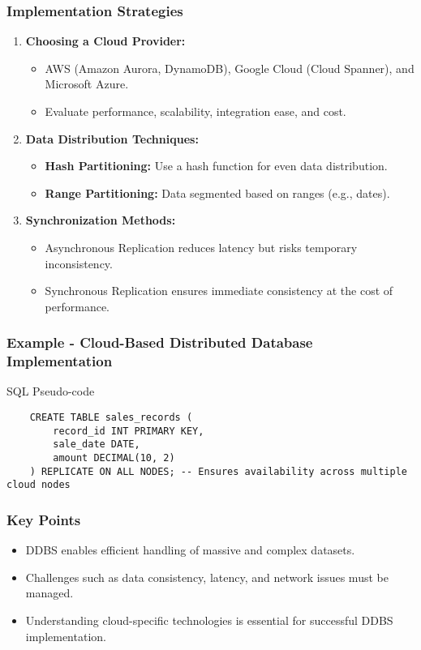 \documentclass[aspectratio=169]{beamer}
\begin{document}
\begin{frame}
    \frametitle{Implementation Strategies}
    \begin{enumerate}
        \item \textbf{Choosing a Cloud Provider:}
        \begin{itemize}
            \item AWS (Amazon Aurora, DynamoDB), Google Cloud (Cloud Spanner), and Microsoft Azure.
            \item Evaluate performance, scalability, integration ease, and cost.
        \end{itemize}

        \item \textbf{Data Distribution Techniques:}
        \begin{itemize}
            \item \textbf{Hash Partitioning:} Use a hash function for even data distribution.
            \item \textbf{Range Partitioning:} Data segmented based on ranges (e.g., dates).
        \end{itemize}

        \item \textbf{Synchronization Methods:}
        \begin{itemize}
            \item Asynchronous Replication reduces latency but risks temporary inconsistency.
            \item Synchronous Replication ensures immediate consistency at the cost of performance.
        \end{itemize}
    \end{enumerate}
\end{frame}

\begin{frame}[fragile]
    \frametitle{Example - Cloud-Based Distributed Database Implementation}
    \begin{block}{SQL Pseudo-code}
    \begin{lstlisting}
    CREATE TABLE sales_records (
        record_id INT PRIMARY KEY,
        sale_date DATE,
        amount DECIMAL(10, 2)
    ) REPLICATE ON ALL NODES; -- Ensures availability across multiple cloud nodes
    \end{lstlisting}
    \end{block}
\end{frame}

\begin{frame}
    \frametitle{Key Points}
    \begin{itemize}
        \item DDBS enables efficient handling of massive and complex datasets.
        \item Challenges such as data consistency, latency, and network issues must be managed.
        \item Understanding cloud-specific technologies is essential for successful DDBS implementation.
    \end{itemize}
\end{frame}
\end{document}
